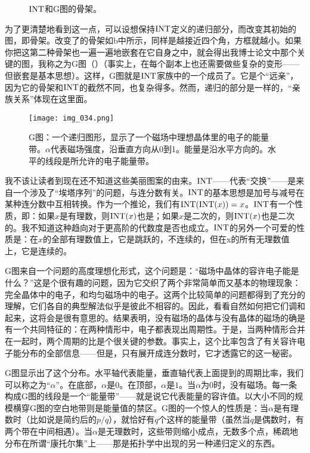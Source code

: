 \begin{sidewaysfigure}
  {\caption{$\operatorname{INT}$和G图的骨架。}}
\end{sidewaysfigure}

为了更清楚地看到这一点，可以设想保持$\operatorname{INT}$定义的递归部分，而改变其初始的图，即骨架。改变了的骨架如b中所示，同样是越接近四个角，方框就越小。如果你把这第二种骨架也一遍一遍地嵌套在它自身之中，就会得出我博士论文中那个关键的图，我称之为G图（）（事实上，在每个副本上也还需要做些复杂的变形——但嵌套是基本思想）。这样，G图就是$\operatorname{INT}$家族中的一个成员了。它是个“远亲”，因为它的骨架和$\operatorname{INT}$的截然不同，也复杂得多。然而，递归的部分是一样的，“亲族关系”体现在这里面。

\begin{figure}
\texttt{[image: img\_034.png]}
\caption[G图：一个递归图形。]
  {G图：一个递归图形，显示了一个磁场中理想晶体里的电子的能量带。$\alpha$代表磁场强度，沿垂直方向从0到1。能量是沿水平方向的。水平的线段是所允许的电子能量带。}
\end{figure}

我不该让读者到现在还不知道这些美丽图案的由来。$\operatorname{INT}$——代表“交换”——是来自一个涉及了“埃塔序列”的问题，与连分数有关。$\operatorname{INT}$的基本思想是加号与减号在某种连分数中互相转换。作为一个推论，我们有$\operatorname{INT}(\operatorname{INT}(x))=x$。$\operatorname{INT}$有一个性质，即：如果$x$是有理数，则$\operatorname{INT}(x)$也是；如果$x$是二次的，则$\operatorname{INT}(x)$也是二次的。我不知道这种趋向对于更高阶的代数度是否也成立。$\operatorname{INT}$的另外一个可爱的性质是：在$x$的全部有理数值上，它是跳跃的，不连续的，但在x的所有无理数值上，它是连续的。

G图来自一个问题的高度理想化形式，这个问题是：“磁场中晶体的容许电子能是什么？”这是个很有趣的问题，因为它交织了两个非常简单而又基本的物理现象：完全晶体中的电子，和均匀磁场中的电子。这两个比较简单的问题都得到了充分的理解，它们各自的典型解法似乎是彼此不相容的。因此，看看自然如何把它们调和起来，这将会是很有意思的。结果表明，没有磁场的晶体与没有晶体的磁场的确是有一个共同特征的：在两种情形中，电子都表现出周期性。于是，当两种情形合并在一起时，两个周期的比是个很关键的参数。事实上，这个比率包含了有关容许电子能分布的全部信息——但是，只有展开成连分数时，它才透露它的这一秘密。

G图显示出了这个分布。水平轴代表能量，垂直轴代表上面提到的周期比率，我们可以称之为“$\alpha$”。在底部，$\alpha$是$0$。在顶部，$\alpha$是$1$。当$\alpha$为$0$时，没有磁场。每一条构成G图的线段是一个“能量带”——就是说它代表能量的容许值。以大小不同的规模横穿G图的空白地带则是能量值的禁区。G图的一个惊人的性质是：当$\alpha$是有理数时（比如说是简约后的$p/q$），就恰好有$q$个这样的能量带（虽然当$q$是偶数时，有两个带在中间相遇）。当$\alpha$是无理数时，这些带则缩小成点，无数多个点，稀疏地分布在所谓“康托尔集”上——那是拓扑学中出现的另一种递归定义的东西。

